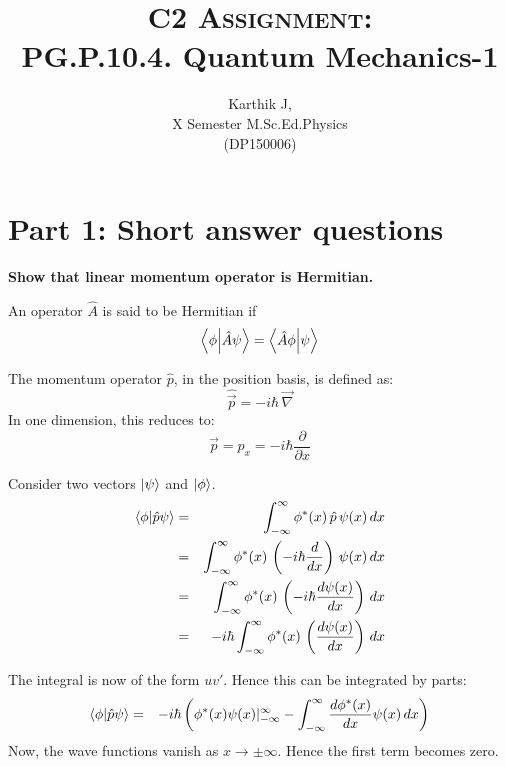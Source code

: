 \documentclass[12pt,a4paper,answers]{exam}
\author{Karthik J,\\X Semester M.Sc.Ed.Physics\\(DP150006)}
\title{\textsc{C2 Assignment}:\\PG.P.10.4. Quantum Mechanics-1}
\newcommand{\pderx}[1]{\dfrac{d#1}{d x}}
\begin{document}
	\maketitle
	\section*{Part 1: Short answer questions}
	
	\begin{questions}
		\setcounter{question}{1}
		
		\question	 \textbf{Show that linear momentum operator is Hermitian.}\\
		
		\begin{solutionorbox}
			An operator $ \hat{A} $ is said to be Hermitian if 
			\begin{equation}\label{eqn:Herm-cond}
			\braket{\phi}{\hat{A}\psi}  = \braket{\hat{A}\phi}{\psi}
			\end{equation}
			
			The momentum operator $ \hat{p} $, in the position basis, is defined as:
			\begin{equation}
			\hat{\vec{p}} = -i \hbar\, \vec{\nabla}
			\end{equation}
			In one dimension, this reduces to:
			\begin{equation}
			\vec{p} = p_x = -i\hbar \dfrac{\partial}{\partial x}
			\end{equation}
			
			Consider two vectors $ \ket{\psi} $ and $ \ket{\phi} $.
			\begin{eqnarray*}
				\braket{\phi}{\hat{p}\psi}  
				&=& \int_{-\infty}^{\infty} \phi^{*}(x)\, \hat{p} \, \psi(x)\, dx \\
				&=& \int_{-\infty}^{\infty} \phi^{*}(x)\, \left(-i\hbar \pderx{ }\right) \, \psi(x)\, dx \\
				&=& \int_{-\infty}^{\infty} \phi^{*}(x)\, \left(-i\hbar \pderx{\psi(x)}\right)\, dx\\ 
				&=& -i\hbar \int_{-\infty}^{\infty} \phi^{*}(x)\, \left( \pderx{\psi(x)}\right)\, dx\\ 
			\end{eqnarray*}
			
			The integral is now of the form $ u v' $. Hence this can be integrated by parts:
			\begin{eqnarray*}
				\braket{\phi}{\hat{p}\psi}  &=& -i\hbar \left( \phi^* (x) \psi(x) |_{-\infty}^{\infty} - \int_{-\infty}^{\infty} \pderx{\phi^* (x)} \psi(x)\, dx \right) 
			\end{eqnarray*}
			Now, the wave functions vanish as $ x \rightarrow \pm \infty $. Hence the first term becomes zero.
			

\end{solutionorbox}
\end{questions}
\end{document}
